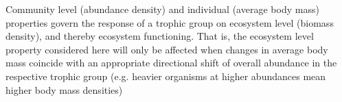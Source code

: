 Community level (abundance density) and individual (average body mass) properties govern the response of a trophic group on ecosystem level (biomass density), and thereby ecosystem functioning. 
That is, the ecosystem level property considered here will only be affected when changes in average body mass coincide with an appropriate directional shift of overall abundance in the respective trophic group (e.g. heavier organisms at higher abundances mean higher body mass densities)